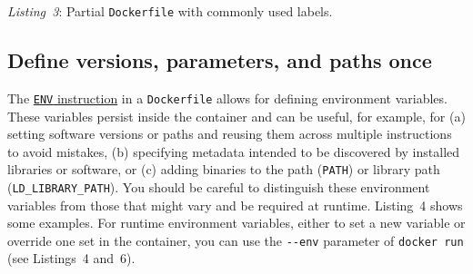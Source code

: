 \documentclass[10pt,letterpaper]{article}
\newenvironment{Shaded}{\begin{snugshade}}{\end{snugshade}}
\newcommand{\KeywordTok}[1]{\textcolor[rgb]{0.13,0.29,0.53}{\textbf{#1}}}
\newcommand{\NormalTok}[1]{#1}
\newcommand{\StringTok}[1]{\textcolor[rgb]{0.31,0.60,0.02}{#1}}
\begin{document}
\scriptsize

\begin{Shaded}
\end{Shaded}

\normalsize

\emph{Listing~3}: Partial \texttt{Dockerfile} with commonly used labels.

\hypertarget{define-versions-parameters-and-paths-once}{%
\subsection{Define versions, parameters, and paths
once}\label{define-versions-parameters-and-paths-once}}

The
\href{https://docs.docker.com/engine/reference/builder/\#env}{\texttt{ENV}
instruction} in a \texttt{Dockerfile} allows for defining environment
variables. These variables persist inside the container and can be
useful, for example, for (a) setting software versions or paths and
reusing them across multiple instructions to avoid mistakes, (b)
specifying metadata intended to be discovered by installed libraries or
software, or (c) adding binaries to the path (\texttt{PATH}) or library
path (\texttt{LD\_LIBRARY\_PATH}). You should be careful to distinguish
these environment variables from those that might vary and be required
at runtime. Listing~4 shows some examples. For runtime environment
variables, either to set a new variable or override one set in the
container, you can use the \texttt{-\/-env} parameter of
\texttt{docker\ run} (see Listings~4 and~6).
\end{document}
